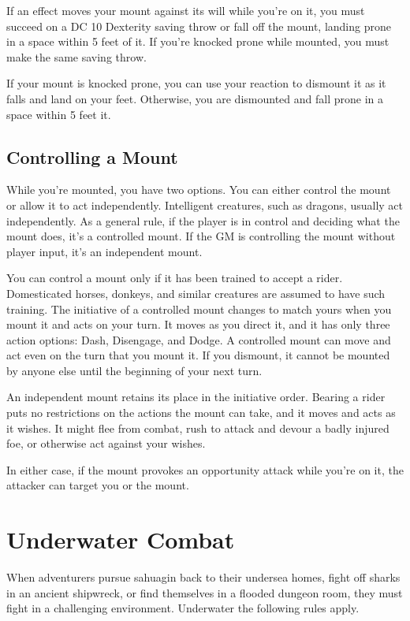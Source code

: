 If an effect moves your mount against its will while you're on it, you must succeed on a DC 10 Dexterity saving throw or fall off the mount, landing prone in a space within 5 feet of it. If you're knocked prone while mounted, you must make the same saving throw.

If your mount is knocked prone, you can use your reaction to dismount it as it falls and land on your feet. Otherwise, you are dismounted and fall prone in a space within 5 feet it.

\subsection{Controlling a Mount}

While you're mounted, you have two options. You can either control the mount or allow it to act independently. Intelligent creatures, such as dragons, usually act independently. As a general rule, if the player is in control and deciding what the mount does, it's a controlled mount. If the GM is controlling the mount without player input, it's an independent mount.

You can control a mount only if it has been trained to accept a rider. Domesticated horses, donkeys, and similar creatures are assumed to have such training. The initiative of a controlled mount changes to match yours when you mount it and acts on your turn. It moves as you direct it, and it has only three action options: Dash, Disengage, and Dodge. A controlled mount can move and act even on the turn that you mount it. If you dismount, it cannot be mounted by anyone else until the beginning of your next turn.

An independent mount retains its place in the initiative order. Bearing a rider puts no restrictions on the actions the mount can take, and it moves and acts as it wishes. It might flee from combat, rush to attack and devour a badly injured foe, or otherwise act against your wishes.

In either case, if the mount provokes an opportunity attack while you're on it, the attacker can target you or the mount.

\section{Underwater Combat}

When adventurers pursue sahuagin back to their undersea homes, fight off sharks in an ancient shipwreck, or find themselves in a flooded dungeon room, they must fight in a challenging environment. Underwater the following rules apply.

